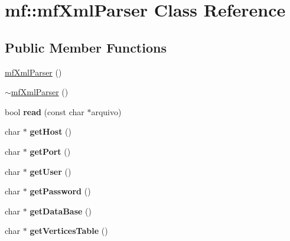 \hypertarget{classmf_1_1mfXmlParser}{
\section{mf::mfXmlParser Class Reference}
\label{classmf_1_1mfXmlParser}
}
\subsection*{Public Member Functions}
\begin{DoxyCompactItemize}
\item 
\hyperlink{classmf_1_1mfXmlParser_ad4d1a1064182d64ad3e116daceecb018}{mfXmlParser} ()
\item 
\hyperlink{classmf_1_1mfXmlParser_a3f6584db78e276c1bd66825d42163098}{$\sim$mfXmlParser} ()
\item 
\hypertarget{classmf_1_1mfXmlParser_a7a76341346a3669a8a1f706dcf7613e7}{
bool {\bfseries read} (const char $\ast$arquivo)}
\label{classmf_1_1mfXmlParser_a7a76341346a3669a8a1f706dcf7613e7}

\item 
\hypertarget{classmf_1_1mfXmlParser_a48bf5f394dbb9261d84e69b70316044b}{
char $\ast$ {\bfseries getHost} ()}
\label{classmf_1_1mfXmlParser_a48bf5f394dbb9261d84e69b70316044b}

\item 
\hypertarget{classmf_1_1mfXmlParser_ac73b0f2f4ef196d1ed067916d37718b2}{
char $\ast$ {\bfseries getPort} ()}
\label{classmf_1_1mfXmlParser_ac73b0f2f4ef196d1ed067916d37718b2}

\item 
\hypertarget{classmf_1_1mfXmlParser_aa89c926cb5e642e66a602c727cb9d1fa}{
char $\ast$ {\bfseries getUser} ()}
\label{classmf_1_1mfXmlParser_aa89c926cb5e642e66a602c727cb9d1fa}

\item 
\hypertarget{classmf_1_1mfXmlParser_a2ac7f2d957209d909f0c8335f979c1b4}{
char $\ast$ {\bfseries getPassword} ()}
\label{classmf_1_1mfXmlParser_a2ac7f2d957209d909f0c8335f979c1b4}

\item 
\hypertarget{classmf_1_1mfXmlParser_a808bcb47487139644fa68e330a1ccfe0}{
char $\ast$ {\bfseries getDataBase} ()}
\label{classmf_1_1mfXmlParser_a808bcb47487139644fa68e330a1ccfe0}

\item 
\hypertarget{classmf_1_1mfXmlParser_ac3c107b483e29c82c66fe959aa1adf59}{
char $\ast$ {\bfseries getVerticesTable} ()}
\label{classmf_1_1mfXmlParser_ac3c107b483e29c82c66fe959aa1adf59}


\end{DoxyCompactItemize}
